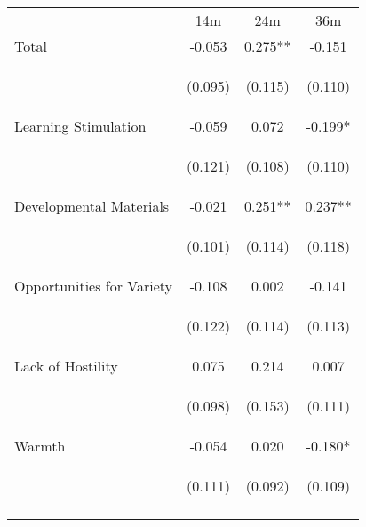 \begin{tabular}{lccc}
\hline \noalign{\smallskip} & 14m & 24m & 36m\\
\noalign{\smallskip}\hline \noalign{\smallskip}Total & -0.053 & 0.275** & -0.151\\
 & \begin{footnotesize}(0.095)\end{footnotesize} & \begin{footnotesize}(0.115)\end{footnotesize} & \begin{footnotesize}(0.110)\end{footnotesize}\\
\noalign{\smallskip}Learning Stimulation & -0.059 & 0.072 & -0.199*\\
 & \begin{footnotesize}(0.121)\end{footnotesize} & \begin{footnotesize}(0.108)\end{footnotesize} & \begin{footnotesize}(0.110)\end{footnotesize}\\
\noalign{\smallskip}Developmental Materials & -0.021 & 0.251** & 0.237**\\
 & \begin{footnotesize}(0.101)\end{footnotesize} & \begin{footnotesize}(0.114)\end{footnotesize} & \begin{footnotesize}(0.118)\end{footnotesize}\\
\noalign{\smallskip}Opportunities for Variety & -0.108 & 0.002 & -0.141\\
 & \begin{footnotesize}(0.122)\end{footnotesize} & \begin{footnotesize}(0.114)\end{footnotesize} & \begin{footnotesize}(0.113)\end{footnotesize}\\
\noalign{\smallskip}Lack of Hostility & 0.075 & 0.214 & 0.007\\
 & \begin{footnotesize}(0.098)\end{footnotesize} & \begin{footnotesize}(0.153)\end{footnotesize} & \begin{footnotesize}(0.111)\end{footnotesize}\\
\noalign{\smallskip}Warmth & -0.054 & 0.020 & -0.180*\\
 & \begin{footnotesize}(0.111)\end{footnotesize} & \begin{footnotesize}(0.092)\end{footnotesize} & \begin{footnotesize}(0.109)\end{footnotesize}\\
\noalign{\smallskip}\hline\end{tabular}\\
